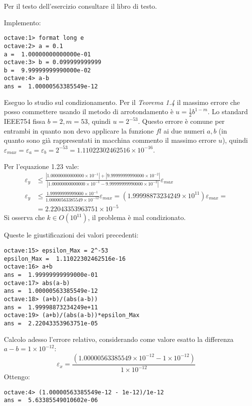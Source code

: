 \begin{exercise}[1.18]
\label{exercise:numericalEraseExercise}
Per il testo dell'esercizio consultare il libro di testo.
\end{exercise}
Implemento:
\begin{lstlisting}
octave:1> format long e
octave:2> a = 0.1
a =  1.00000000000000e-01
octave:3> b = 0.099999999999
b =  9.99999999990000e-02
octave:4> a-b
ans =  1.00000563385549e-12
\end{lstlisting}
Eseguo lo studio sul condizionamento. Per il \emph{Teorema 1.4} il massimo errore
che posso commettere usando il metodo di arrotondamento \`e $u = \frac{1}{2}b^{1-m}$.
Lo standard IEEE754 fissa $b = 2, m = 53$, quindi $u = 2^{-53}$. Questo errore
\`e comune per entrambi in quanto non devo applicare la funzione $fl$ ai due
numeri $a, b$ (in quanto sono gi\`a rappresentati in macchina commento il
massimo errore $u$), quindi $\varepsilon_{max} = \varepsilon_{a} =
\varepsilon_{b} = 2^{-53} = 1.11022302462516  \times 10^{-16}$.

Per l'equazione 1.23 vale:
\begin{displaymath}
\begin{split}
	\varepsilon_{y} & \leq \frac{|1.00000000000000 \times 10^{-1}| + 
			|9.99999999990000 \times 10^{-2}|}
		{|1.00000000000000 \times 10^{-1} - 
			9.99999999990000 \times 10^{-2}|}\varepsilon_{max} \\
	\varepsilon_{y} & \leq \frac{1.99999999999000\times 10^{-1}}
		{1.00000563385549\times 10^{-12}}\varepsilon_{max} = 
		(1.99998873234249\times 10^{11})\varepsilon_{max} = \\
	& = 2.22043353963751\times 10^{-5}
\end{split}
\end{displaymath}
Si osserva che $k \in O(10^{11})$, il problema \`e mal condizionato.

Queste le giustificazioni dei valori precedenti:
\begin{lstlisting}
octave:15> epsilon_Max = 2^-53
epsilon_Max =  1.11022302462516e-16
octave:16> a+b
ans =  1.99999999999000e-01
octave:17> abs(a-b)
ans =  1.00000563385549e-12
octave:18> (a+b)/(abs(a-b))
ans =  1.99998873234249e+11
octave:19> (a+b)/(abs(a-b))*epsilon_Max
ans =  2.22043353963751e-05
\end{lstlisting}

Calcolo adesso l'errore relativo, considerando come valore esatto la differenza
$a - b = 1 \times 10^{-12}$:
\begin{displaymath}
	\varepsilon_{x} = \frac{(1.00000563385549 \times 10^{-12} - 1 \times
	10^{-12})}{1 \times 10^{-12}}
\end{displaymath}
Ottengo:
\begin{lstlisting}
octave:4> (1.00000563385549e-12 - 1e-12)/1e-12
ans =  5.63385549010602e-06
\end{lstlisting}
















